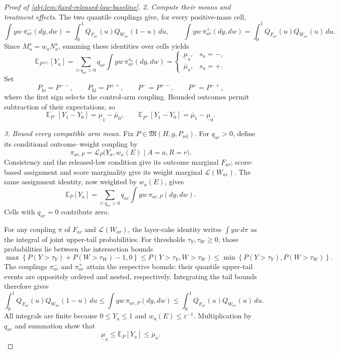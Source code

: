 \begin{proof}[Proof of \cref{obj:lem:fixed-released-law-baseline}]
\noindent\emph{2. Compute their means and treatment effects.}
The two quantile couplings give, for every positive-mass cell,
\[
\int yw\,\pi_{ar}^{-}(dy,dw)
=\int_0^1 Q_{F_{ar}}(u)Q_{W_{ar}}(1-u)\,du,
\qquad
\int yw\,\pi_{ar}^{+}(dy,dw)
=\int_0^1 Q_{F_{ar}}(u)Q_{W_{ar}}(u)\,du.
\]
Since \(M_a^{s}=w_aN_a^{s}\), summing these identities over cells yields
\[
\mathbb E_{P^{s_0s_1}}[Y_a]
=\sum_{r:q_{ar}>0}q_{ar}\int yw\,\pi_{ar}^{s_a}(dy,dw)
=
\begin{cases}
\underline\mu_a,&s_a=-,\\
\overline\mu_a,&s_a=+.
\end{cases}
\]
Set
\[
P_{\mathrm{lo}}=P^{--},\qquad P_{\mathrm{hi}}=P^{++},
\qquad P^-=P^{+-},\qquad P^+=P^{-+},
\]
where the first sign selects the control-arm coupling. Bounded outcomes permit subtraction of their expectations, so
\begin{equation}\label{eq:fixed-law-ate-endpoints}
\mathbb E_{P^-}[Y_1-Y_0]=\underline\mu_1-\overline\mu_0,
\qquad
\mathbb E_{P^+}[Y_1-Y_0]=\overline\mu_1-\underline\mu_0.
\end{equation}

\noindent\emph{3. Bound every compatible arm mean.}
Fix \(P\in\mathfrak M(H,g,P_{\mathrm{rel}})\). For \(q_{ar}>0\), define its conditional outcome–weight coupling by
\[
\pi_{ar,P}
=\mathcal L_P\bigl(Y_a,w_a(E)\mid A=a,R=r\bigr).
\]
Consistency and the released-law condition give its outcome marginal \(F_{ar}\); score-based assignment and score marginality give its weight marginal \(\mathcal L(W_{ar})\). The same assignment identity, now weighted by \(w_a(E)\), gives
\[
\mathbb E_P[Y_a]
=\sum_{r:q_{ar}>0}q_{ar}\int yw\,\pi_{ar,P}(dy,dw).
\]
Cells with \(q_{ar}=0\) contribute zero.

For any coupling \(\pi\) of \(F_{ar}\) and \(\mathcal L(W_{ar})\), the layer-cake identity writes \(\int yw\,d\pi\) as the integral of joint upper-tail probabilities. For thresholds \(\tau_Y,\tau_W\ge0\), those probabilities lie between the intersection bounds
\[
\max\!\left\{P(Y>\tau_Y)+P(W>\tau_W)-1,0\right\}
\le P(Y>\tau_Y,W>\tau_W)
\le \min\!\left\{P(Y>\tau_Y),P(W>\tau_W)\right\}.
\]
The couplings \(\pi_{ar}^{-}\) and \(\pi_{ar}^{+}\) attain the respective bounds: their quantile upper-tail events are oppositely ordered and nested, respectively. Integrating the tail bounds therefore gives
\[
\int_0^1 Q_{F_{ar}}(u)Q_{W_{ar}}(1-u)\,du
\le \int yw\,\pi_{ar,P}(dy,dw)
\le \int_0^1 Q_{F_{ar}}(u)Q_{W_{ar}}(u)\,du.
\]
All integrals are finite because \(0\le Y_a\le1\) and \(w_a(E)\le\varepsilon^{-1}\). Multiplication by \(q_{ar}\) and summation show that
\begin{equation}\label{eq:fixed-law-arm-bound}
\underline\mu_a\le\mathbb E_P[Y_a]\le\overline\mu_a.
\end{equation}


\end{proof}
